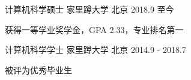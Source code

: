 

\begin{cventries}

  \cventry
    {计算机科学{\enskip\cdotp\enskip}硕士} %
    {家里蹲大学} %
    {北京} %
    {2018.9 至今} %
    {
      \begin{cvitems} %
        \item {获得一等学业奖学金，GPA $2.33$，专业排名第一}
      \end{cvitems}
    }

  \cventry
{计算机科学{\enskip\cdotp\enskip}学士} %
{家里蹲大学} %
{北京} %
{2014.9 - 2018.7} %
{
	\begin{cvitems} %
		\item {被评为优秀毕业生}
	\end{cvitems}
}

\end{cventries}
